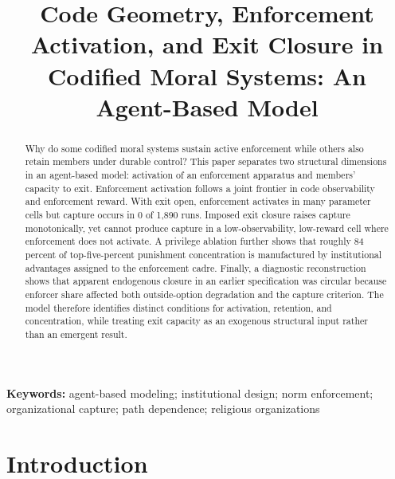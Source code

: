 \documentclass[12pt]{article}
\title{Code Geometry, Enforcement Activation, and Exit Closure in Codified Moral Systems: An Agent-Based Model}
\author{}
\date{}
\date{}
\newcommand{\affiliation}{}
\begin{document}
\maketitle
\vspace{1em}


\begin{abstract}
Why do some codified moral systems sustain active enforcement while others also retain members under durable control? This paper separates two structural dimensions in an agent-based model: activation of an enforcement apparatus and members' capacity to exit. Enforcement activation follows a joint frontier in code observability and enforcement reward. With exit open, enforcement activates in many parameter cells but capture occurs in 0 of 1,890 runs. Imposed exit closure raises capture monotonically, yet cannot produce capture in a low-observability, low-reward cell where enforcement does not activate. A privilege ablation further shows that roughly 84 percent of top-five-percent punishment concentration is manufactured by institutional advantages assigned to the enforcement cadre. Finally, a diagnostic reconstruction shows that apparent endogenous closure in an earlier specification was circular because enforcer share affected both outside-option degradation and the capture criterion. The model therefore identifies distinct conditions for activation, retention, and concentration, while treating exit capacity as an exogenous structural input rather than an emergent result.
\end{abstract}
\vspace{1em}\noindent\textbf{Keywords:} agent-based modeling; institutional design; norm enforcement; organizational capture; path dependence; religious organizations

\newpage


\section{Introduction}
\end{document}
